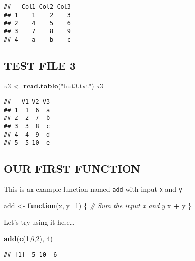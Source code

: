 \documentclass[]{article}
\newenvironment{Shaded}{\begin{snugshade}}{\end{snugshade}}
\newcommand{\CommentTok}[1]{\textcolor[rgb]{0.56,0.35,0.01}{\textit{#1}}}
\newcommand{\ControlFlowTok}[1]{\textcolor[rgb]{0.13,0.29,0.53}{\textbf{#1}}}
\newcommand{\DataTypeTok}[1]{\textcolor[rgb]{0.13,0.29,0.53}{#1}}
\newcommand{\DecValTok}[1]{\textcolor[rgb]{0.00,0.00,0.81}{#1}}
\newcommand{\KeywordTok}[1]{\textcolor[rgb]{0.13,0.29,0.53}{\textbf{#1}}}
\newcommand{\NormalTok}[1]{#1}
\newcommand{\OperatorTok}[1]{\textcolor[rgb]{0.81,0.36,0.00}{\textbf{#1}}}
\newcommand{\StringTok}[1]{\textcolor[rgb]{0.31,0.60,0.02}{#1}}
\begin{document}
\begin{verbatim}
##   Col1 Col2 Col3
## 1    1    2    3
## 2    4    5    6
## 3    7    8    9
## 4    a    b    c
\end{verbatim}

\hypertarget{test-file-3}{%
\subsection{TEST FILE 3}\label{test-file-3}}

\begin{Shaded}
\begin{Highlighting}[]
\NormalTok{x3 <-}\StringTok{ }\KeywordTok{read.table}\NormalTok{(}\StringTok{"test3.txt"}\NormalTok{)}
\NormalTok{x3}
\end{Highlighting}
\end{Shaded}

\begin{verbatim}
##   V1 V2 V3
## 1  1  6  a
## 2  2  7  b
## 3  3  8  c
## 4  4  9  d
## 5  5 10  e
\end{verbatim}

\hypertarget{our-first-function}{%
\subsection{OUR FIRST FUNCTION}\label{our-first-function}}

This is an example function named \texttt{add} with input \texttt{x} and
\texttt{y}

\begin{Shaded}
\begin{Highlighting}[]
\NormalTok{add <-}\StringTok{ }\ControlFlowTok{function}\NormalTok{(x, }\DataTypeTok{y=}\DecValTok{1}\NormalTok{) \{}
 \CommentTok{# Sum the input x and y}
\NormalTok{ x }\OperatorTok{+}\StringTok{ }\NormalTok{y}
\NormalTok{\}}
\end{Highlighting}
\end{Shaded}

Let's try using it here\ldots{}

\begin{Shaded}
\begin{Highlighting}[]
\KeywordTok{add}\NormalTok{(}\KeywordTok{c}\NormalTok{(}\DecValTok{1}\NormalTok{,}\DecValTok{6}\NormalTok{,}\DecValTok{2}\NormalTok{), }\DecValTok{4}\NormalTok{)}
\end{Highlighting}
\end{Shaded}

\begin{verbatim}
## [1]  5 10  6
\end{verbatim}
\end{document}
